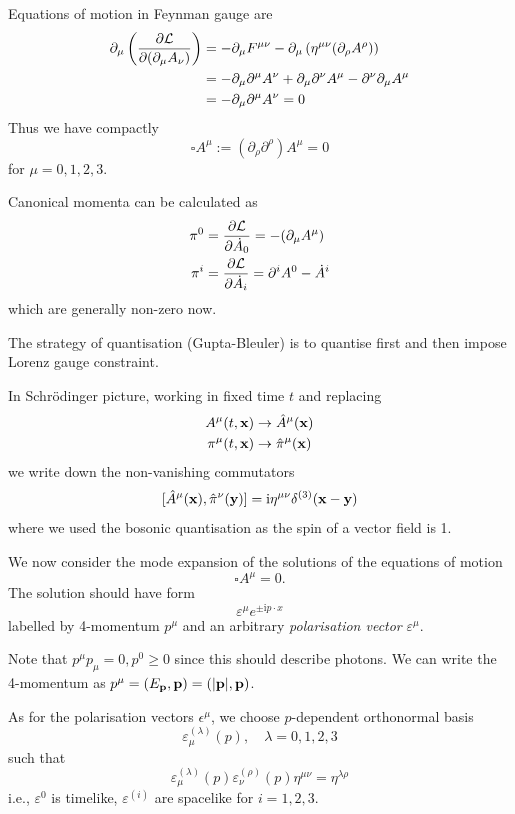 \documentclass[a4paper,11pt]{article}
\begin{document}
	Equations of motion in Feynman gauge are 
	\begin{align*}
		\partial_\mu \left( \pdv{\mathcal{L}}{(\partial_\mu A_\nu)} \right) &= - \partial_\mu F ^{\mu \nu}
		- \partial_\mu \left( \eta ^{\mu \nu} (\partial_\rho A^\rho) \right)\\
		 & = - \partial_\mu \partial^\mu A^\nu + \partial_\mu \partial^\nu A^\mu - \partial^\nu \partial_\mu A^\mu\\
		 & = - \partial_\mu \partial^\mu A^\nu = 0
	\end{align*}
	Thus we have compactly 
	\[
		\square A^\mu := (\partial_\rho \partial^\rho) A^\mu = 0
	\]
	for $\mu = 0,1,2,3$.

	Canonical momenta can be calculated as 
	\begin{align*}
		\pi^0 & = \pdv{\mathcal{L}}{\dot A_0}  = - (\partial_\mu A^\mu)\\
		\pi^i & = \pdv{\mathcal{L}}{\dot A_i}  = \partial^i A^0 - \dot A^i
	\end{align*}
	which are generally non-zero now.

	The strategy of quantisation (Gupta-Bleuler) is to quantise first and then impose Lorenz gauge constraint. 

	In Schr\"odinger picture, working in fixed time $t$ and replacing
	\begin{align*}
		A^\mu(t,\vb x) &\to \hat A^\mu(\vb x)\\
		\pi^\mu(t,\vb x) & \to \hat \pi^\mu(\vb x)
	\end{align*}
	we write down the non-vanishing commutators
	\[
		[\hat A^\mu(\vb x), \hat \pi^\nu(\vb y)] = \mathrm{i}\eta ^{\mu \nu} \delta ^{(3)}(\vb x - \vb y)
	\]
	where we used the bosonic quantisation as the spin of a vector field is 1.

	We now consider the mode expansion of the solutions of the equations of motion 
	\[
		\square A^\mu = 0.
	\]
	The solution should have form 
	\[
		\varepsilon^\mu e ^{\pm \mathrm{i} p \cdot x}
	\]
	labelled by 4-momentum $p^\mu$ and an arbitrary \emph{polarisation vector} $\varepsilon^\mu$.

	Note that $p^\mu p_\mu = 0, p^0 \geq 0$ since this should describe photons. We can write the 4-momentum as $p^\mu = (E _{\vb p}, \vb p) = (\abs{\vb p}, \vb p)$. 
	
	As for the polarisation vectors $\epsilon^\mu$, we choose $p$-dependent orthonormal basis
	\[
		\varepsilon ^{(\lambda)}_\mu (p), \quad \lambda = 0,1,2,3
	\]
	such that 
	\[
		\varepsilon ^{(\lambda)}_\mu(p) \varepsilon ^{(\rho)}_\nu (p) \eta ^{\mu \nu} = \eta ^{\lambda \rho}
	\]
	i.e., $\varepsilon ^{0}$ is timelike, $\varepsilon ^{(i)}$ are spacelike for $i = 1,2,3$.
\end{document}
